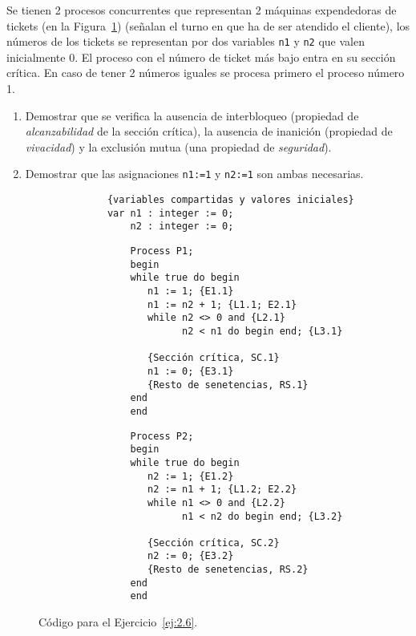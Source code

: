 \begin{ejercicio}\label{ej:2.6}
    Se tienen 2 procesos concurrentes que representan 2 máquinas expendedoras de tickets (en la Figura~\ref{fig:cod_6}) (señalan el turno en que ha de ser atendido el cliente), los números de los tickets se representan por dos variables \verb|n1| y \verb|n2| que valen inicialmente 0. El proceso con el número de ticket más bajo entra en su sección crítica. En caso de tener 2 números iguales se procesa primero el proceso número 1.
    \begin{enumerate}[label=(\alph*)]
        \item Demostrar que se verifica la ausencia de interbloqueo (propiedad de \textit{alcanzabilidad} de la sección crítica), la ausencia de inanición (propiedad de \textit{vivacidad}) y la exclusión mutua (una propiedad de \textit{seguridad}).
        \item Demostrar que las asignaciones \verb|n1:=1| y \verb|n2:=1| son ambas necesarias.
    \end{enumerate}

    \begin{figure}
        \centering
        \begin{verbatim}
            {variables compartidas y valores iniciales}
            var n1 : integer := 0;
                n2 : integer := 0;
        \end{verbatim}
        \setlength{\columnsep}{1cm}
        \begin{multicols}{2}
            \begin{verbatim}
                Process P1;
                begin
                while true do begin
                   n1 := 1; {E1.1}
                   n1 := n2 + 1; {L1.1; E2.1}
                   while n2 <> 0 and {L2.1}
                         n2 < n1 do begin end; {L3.1}

                   {Sección crítica, SC.1}
                   n1 := 0; {E3.1}
                   {Resto de senetencias, RS.1}
                end
                end
            \end{verbatim}
            \begin{verbatim}
                Process P2;
                begin
                while true do begin
                   n2 := 1; {E1.2}
                   n2 := n1 + 1; {L1.2; E2.2}
                   while n1 <> 0 and {L2.2}
                         n1 < n2 do begin end; {L3.2}

                   {Sección crítica, SC.2}
                   n2 := 0; {E3.2}
                   {Resto de senetencias, RS.2}
                end
                end
            \end{verbatim}
        \end{multicols}
        \caption{Código para el Ejercicio~\ref{ej:2.6}.}
        \label{fig:cod_6}
    \end{figure}
\end{ejercicio}

